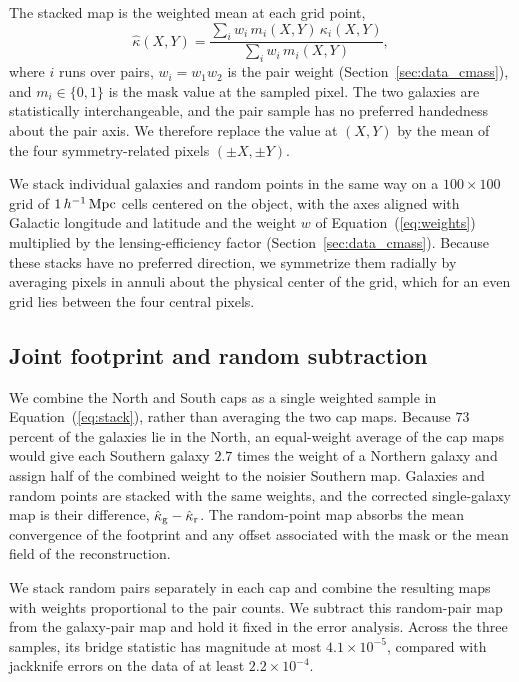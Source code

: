 The stacked map is the weighted mean at each grid point,
\begin{equation}
  \hat\kappa(X,Y) = \frac{\sum_{i} w_{i}\,m_{i}(X,Y)\,\kappa_{i}(X,Y)}
                         {\sum_{i} w_{i}\,m_{i}(X,Y)},
  \label{eq:stack}
\end{equation}
where $i$ runs over pairs, $w_{i}=w_{1}w_{2}$ is the pair weight
(Section~\ref{sec:data_cmass}), and $m_{i}\in\{0,1\}$ is the mask value at
the sampled pixel. The two galaxies are statistically interchangeable, and
the pair sample has no preferred handedness about the pair axis. We therefore
replace the value at $(X,Y)$ by the mean of the four symmetry-related pixels
$(\pm X,\pm Y)$.

We stack individual galaxies and random points in the same way on a
$100\times100$ grid of $1\,h^{-1}\,{\rm Mpc}$ cells centered on the object, with the
axes aligned with Galactic longitude and latitude and the weight $w$ of
Equation~(\ref{eq:weights}) multiplied by the lensing-efficiency factor
(Section~\ref{sec:data_cmass}). Because these stacks have no preferred
direction, we symmetrize them radially by averaging pixels in annuli about
the physical center of the grid, which for an even grid lies between the
four central pixels.

\subsection{Joint footprint and random subtraction}
\label{sec:joint}

We combine the North and South caps as a single weighted sample in
Equation~(\ref{eq:stack}), rather than averaging the two cap maps. Because
$73$ percent of the galaxies lie in the North, an equal-weight average of the
cap maps would give each Southern galaxy $2.7$ times the weight of a Northern
galaxy and assign half of the combined weight to the noisier Southern map.
Galaxies and random points are stacked with the same weights, and the
corrected single-galaxy map is their difference,
$\hat\kappa_{\rm g}-\hat\kappa_{\rm r}$. The random-point map absorbs the
mean convergence of the footprint and any offset associated with the mask
or the mean field of the reconstruction.

We stack random pairs separately in each cap and combine the resulting maps
with weights proportional to the pair counts. We subtract this random-pair
map from the galaxy-pair map and hold it fixed in the error analysis. Across
the three samples, its bridge statistic has magnitude at most
$4.1\times10^{-5}$, compared with jackknife errors on the data of at least
$2.2\times10^{-4}$.

